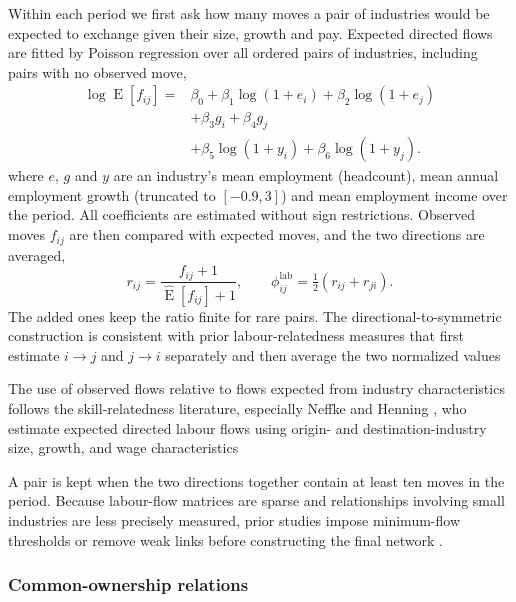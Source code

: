 \documentclass[9pt,twoside]{pnas-new}
\begin{document}
Within each period we first ask how many moves a pair of industries would be
expected to exchange given their size, growth and pay. Expected directed flows
are fitted by Poisson regression over all ordered pairs of industries,
including pairs with no observed move,
\begin{equation}
\begin{aligned}
\log \operatorname{E}[f_{ij}]
={}& \beta_0
+\beta_1 \log(1+e_i)
+\beta_2 \log(1+e_j) \\
&+\beta_3 g_i
+\beta_4 g_j \\
&+\beta_5 \log(1+y_i)
+\beta_6 \log(1+y_j).
\end{aligned}
\label{eq:expected-worker-flow}
\end{equation}
where $e$, $g$ and $y$ are an industry's mean employment (headcount), mean annual
employment growth (truncated to $[-0.9,3]$) and mean employment income over the period.
All coefficients are estimated without sign restrictions. Observed moves $f_{ij}$ are
then compared with expected moves, and the two directions are averaged,
\begin{equation}
r_{ij}=\frac{f_{ij}+1}{\widehat{\operatorname{E}}[f_{ij}]+1},
\qquad
\phi^{\mathrm{lab}}_{ij}=\tfrac{1}{2}\left(r_{ij}+r_{ji}\right).
\label{eq:labour-relatedness}
\end{equation}
The added ones keep the ratio finite for rare pairs. The directional-to-symmetric construction is consistent with prior labour-relatedness measures that first estimate $i\rightarrow j$ and $j\rightarrow i$ separately and then average the two normalized values \cite{elekesRegionalResilienceNetwork2024}

The use of observed flows relative to flows expected from industry characteristics follows the skill-relatedness literature, especially Neffke and Henning \cite{neffkeSkillRelatednessFirm2013}, who estimate expected directed labour flows using origin- and destination-industry size, growth, and wage characteristics

A pair is kept when the two directions together contain at least ten moves in the period. Because labour-flow matrices are sparse and relationships involving small industries are less precisely measured, prior studies impose minimum-flow thresholds or remove weak links before constructing the final network \cite{ocleryModularStructureLabour2022}.

\subsubsection{Common-ownership relations}
\label{subsubsec:common-ownership}
\end{document}
